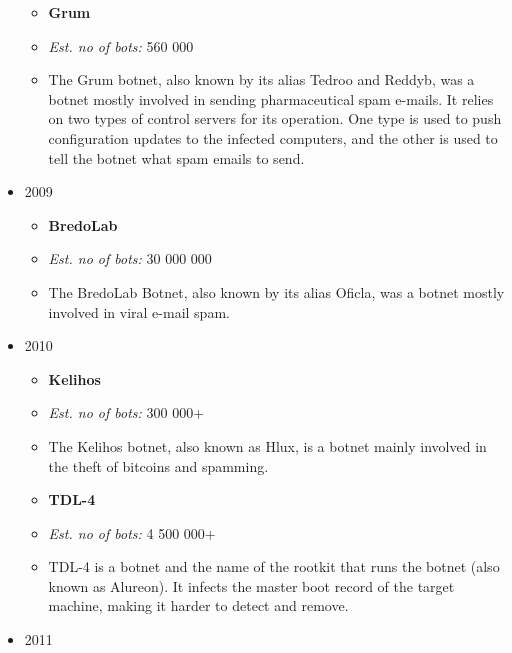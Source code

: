 \documentclass[]{article}
\begin{document}
\begin{itemize}
{\begin{itemize}
\item \textbf{Grum} \cite{website:grum}

\item \textit{Est. no of bots:} 560 000

\item The Grum botnet, also known by its alias Tedroo and Reddyb, was a botnet mostly involved in sending pharmaceutical spam e-mails. It relies on two types of control servers for its operation. One type is used to push configuration updates to the infected computers, and the other is used to tell the botnet what spam emails to send.
\end{itemize}
}

	\item{ 2009

\begin{itemize}
	\item \textbf{BredoLab}

	\item \textit{Est. no of bots:} 30 000 000
	
	\item The BredoLab Botnet, also known by its alias Oficla, was a botnet mostly involved in viral e-mail spam.

\end{itemize}
}

	\item{ 2010

\begin{itemize}
	\item \textbf{Kelihos} \cite{website:kelihos}

	\item \textit{Est. no of bots:} 300 000+

	\item The Kelihos botnet, also known as Hlux, is a botnet mainly involved in the theft of bitcoins and spamming.

	\item \textbf{TDL-4} \cite{website:TDL4}

	\item \textit{Est. no of bots:} 4 500 000+

	\item TDL-4 is a botnet and the name of the rootkit that runs the botnet (also known as Alureon). It infects the master boot record of the target machine, making it harder to detect and remove.

\end{itemize}
}
	\item{ 2011

}
\end{itemize}
\end{document}
